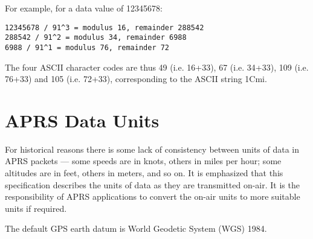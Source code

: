 For example, for a data value of 12345678:
\begin{verbatim}
12345678 / 91^3 = modulus 16, remainder 288542
288542 / 91^2 = modulus 34, remainder 6988
6988 / 91^1 = modulus 76, remainder 72
\end{verbatim}

The four ASCII character codes are thus 49 (i.e. 16+33), 67 (i.e. 34+33), 109
(i.e. 76+33) and 105 (i.e. 72+33), corresponding to the ASCII string 1Cmi.

\section{APRS Data Units}

For historical reasons there is some lack of consistency between units of data
in APRS packets — some speeds are in knots, others in miles per hour; some
altitudes are in feet, others in meters, and so on. It is emphasized that this
specification describes the units of data as they are transmitted on-air. It is
the responsibility of APRS applications to convert the on-air units to more
suitable units if required.

The default GPS earth datum is World Geodetic System (WGS) 1984.


